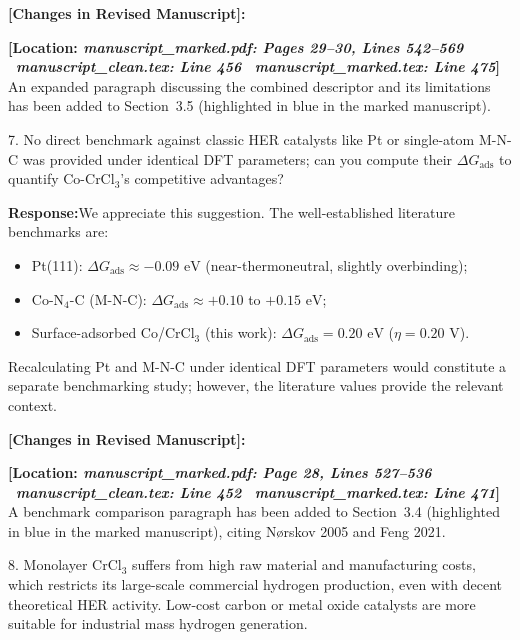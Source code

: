 \documentclass[11pt, sans, a4paper]{moderncv}
\newcommand{\response}{\vspace{0.4em}\noindent\textbf{\color{actionblue}Response:}\hspace{0.5em}}
\newcommand{\manuscriptchange}[1]{\vspace{0.4em}\noindent\textbf{\color{acsblue}[Changes in Revised Manuscript]:}\par\nopagebreak\vspace{0.15em}#1\vspace{0.4em}}
\begin{document}
\manuscriptchange{\textbf{[Location: \textit{manuscript\_marked.pdf: Pages 29--30, Lines 542--569} \textbar\ \textit{manuscript\_clean.tex: Line 456} \textbar\ \textit{manuscript\_marked.tex: Line 475}]}\\ An expanded paragraph discussing the combined descriptor and its limitations has been added to Section~3.5 (highlighted in blue in the marked manuscript).}

\vspace{0.8em}

\begin{reviewercomment}
7. No direct benchmark against classic HER catalysts like Pt or single-atom M-N-C was provided under identical DFT parameters; can you compute their $\Delta G_{\mathrm{ads}}$ to quantify $\text{Co-CrCl}_3$'s competitive advantages?
\end{reviewercomment}

\response We appreciate this suggestion. The well-established literature benchmarks are:
\begin{itemize}[leftmargin=1.5em, itemsep=0.2em]
\item Pt(111): $\Delta G_{\mathrm{ads}} \approx -0.09\text{ eV}$ (near-thermoneutral, slightly overbinding);
\item Co-N$_4$-C (M-N-C): $\Delta G_{\mathrm{ads}} \approx +0.10$ to $+0.15\text{ eV}$;
\item Surface-adsorbed Co/CrCl$_3$ (this work): $\Delta G_{\mathrm{ads}} = 0.20\text{ eV}$ ($\eta = 0.20\text{ V}$).
\end{itemize}
Recalculating Pt and M-N-C under identical DFT parameters would constitute a separate benchmarking study; however, the literature values provide the relevant context.

\manuscriptchange{\textbf{[Location: \textit{manuscript\_marked.pdf: Page 28, Lines 527--536} \textbar\ \textit{manuscript\_clean.tex: Line 452} \textbar\ \textit{manuscript\_marked.tex: Line 471}]}\\ A benchmark comparison paragraph has been added to Section~3.4 (highlighted in blue in the marked manuscript), citing N{\o}rskov 2005 and Feng 2021.}

\vspace{0.8em}

\begin{reviewercomment}
8. Monolayer $\text{CrCl}_3$ suffers from high raw material and manufacturing costs, which restricts its large-scale commercial hydrogen production, even with decent theoretical HER activity. Low-cost carbon or metal oxide catalysts are more suitable for industrial mass hydrogen generation.
\end{reviewercomment}
\end{document}
